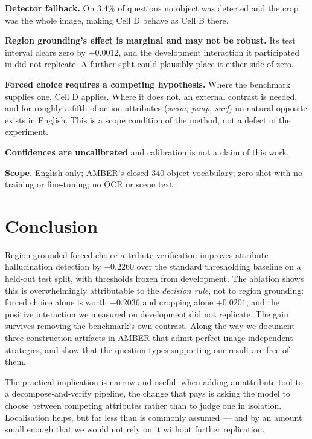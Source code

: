 \documentclass[conference]{IEEEtran}
\begin{document}
\textbf{Detector fallback.} On $3.4\%$ of questions no object was detected and
the crop was the whole image, making Cell D behave as Cell B there.

\textbf{Region grounding's effect is marginal and may not be robust.} Its test
interval clears zero by $+0.0012$, and the development interaction it participated
in did not replicate. A further split could plausibly place it either side of
zero.

\textbf{Forced choice requires a competing hypothesis.} Where the benchmark
supplies one, Cell D applies. Where it does not, an external contrast is needed,
and for roughly a fifth of action attributes (\emph{swim}, \emph{jump},
\emph{surf}) no natural opposite exists in English. This is a scope condition of
the method, not a defect of the experiment.

\textbf{Confidences are uncalibrated} and calibration is not a claim of this work.

\textbf{Scope.} English only; AMBER's closed 340-object vocabulary; zero-shot
with no training or fine-tuning; no OCR or scene text.

\section{Conclusion}

Region-grounded forced-choice attribute verification improves attribute
hallucination detection by $+0.2260$ over the standard thresholding baseline on a
held-out test split, with thresholds frozen from development. The ablation shows
this is overwhelmingly attributable to the \emph{decision rule}, not to region
grounding: forced choice alone is worth $+0.2036$ and cropping alone $+0.0201$,
and the positive interaction we measured on development did not replicate. The
gain survives removing the benchmark's own contrast. Along the way we document three construction
artifacts in AMBER that admit perfect image-independent strategies, and show that
the question types supporting our result are free of them.

The practical implication is narrow and useful: when adding an attribute tool to
a decompose-and-verify pipeline, the change that pays is asking the model to
choose between competing attributes rather than to judge one in isolation.
Localisation helps, but far less than is commonly assumed --- and by an amount
small enough that we would not rely on it without further replication.
\end{document}
